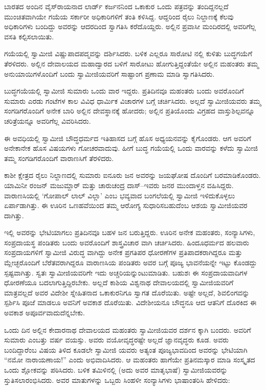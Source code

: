 ಬಾರತದ ಅಂದಿನ ವೈಸ್​ರಾಯನಾದ ಲಾರ್ಡ್ ಕರ್ಜನನಿಂದ ಒಕಾಕುರ ಒಂದು ಪತ್ರವನ್ನು ತಂದಿದ್ದನಲ್ಲದೆ ಮುಂಚಿತವಾಗಿಯೇ ಗಯೆಯ ಸರ್ಕಾರೀ ಅಧಿಕಾರಿಗಳಿಗೆ ತಂತಿ ಕಳಿಸಿದ್ದ. ಆದ್ದರಿಂದ ರೈಲು ನಿಲ್ದಾಣಕ್ಕೆ ಕೆಲವು ಅಧಿಕಾರಿಗಳು ಬಂದಿದ್ದು ಅವರನ್ನು ಆದರದಿಂದ ಸ್ವಾಗತಿಸಿ ಕರೆದೊಯ್ದರು. ಅಲ್ಲಿನ ಪ್ರವಾಸೀ ಮಂದಿರದಲ್ಲಿ ಅವರಿಗೆಲ್ಲ ವಸತಿ ಕಲ್ಪಿಸಲಾಯಿತು.

ಗಯೆಯಲ್ಲಿ ಸ್ವಾಮೀಜಿ ವಿಷ್ಣುಪಾದಪದ್ಮವನ್ನು ದರ್ಶಿಸಿದರು. ಬಳಿಕ ಎಲ್ಲರೂ ಸಾರೋಟಿ ನಲ್ಲಿ ಕುಳಿತು ಬುದ್ಧಗಯೆಗೆ ತೆರಳಿದರು. ಅಲ್ಲಿನ ದೇವಾಲಯದ ಮಹಾದ್ವಾರದ ಬಳಿಗೆ ಸಾರೋಟು ಹೋಗುತ್ತಿದ್ದಂತೆಯೇ ಅಲ್ಲಿನ ಮಹಂತರು ತಮ್ಮ ಅನುಯಾಯಿಗಳೊಂದಿಗೆ ಬಂದು ಸ್ವಾಮೀಜಿಯವರಿಗೆ ಸಾಷ್ಟಾಂಗ ಪ್ರಣಾಮ ಮಾಡಿ ಸ್ವಾಗತಿಸಿದರು.

ಬುದ್ಧಗಯೆಯಲ್ಲಿ ಸ್ವಾಮೀಜಿ ಸುಮಾರು ಒಂದು ವಾರ ಇದ್ದರು. ಪ್ರತಿದಿನವೂ ಮಹಂತರು ಬಂದು ಅವರೊಂದಿಗೆ ಸುಮಾರು ಎರಡು ಗಂಟೆಗಳ ಕಾಲ ವಿವಿಧ ಧಾರ್ಮಿಕ ವಿಚಾರಗಳ ಬಗ್ಗೆ ಚರ್ಚಿಸಿದರು. ಅಲ್ಲದೆ ಸ್ವಾಮೀಜಿಯವರು ತಮ್ಮ ಸಂಗಡಿಗರೊಂದಿಗೆ ಅನೇಕ ಬಾರಿ ಅಲ್ಲಿನ ದೇವಸ್ಥಾನಕ್ಕೆ ಹೋದರು; ಅಲ್ಲಿನ ಪ್ರತಿಯೊಂದು ವಿಗ್ರಹದ ವಾಸ್ತುಶಿಲ್ಪವನ್ನೂ ಚರಿತ್ರೆಯನ್ನೂ ಅವರಿಗೆಲ್ಲ ವಿವರಿಸಿದರು.

ಈ ಅವಧಿಯಲ್ಲಿ ಸ್ವಾಮೀಜಿ ಬೌದ್ಧಧರ್ಮದ ಇತಿಹಾಸದ ಬಗ್ಗೆ ಹೊಸ ಅಧ್ಯಯನವನ್ನು ಕೈಗೊಂಡರು. ಆಗ ಅವರಿಗೆ ಅನೇಕಾನೇಕ ಹೊಸ ವಿಷಯಗಳು ಗೋಚರವಾದುವು. ಹೀಗೆ ಬುದ್ಧ ಗಯೆಯಲ್ಲಿ ಒಂದು ವಾರವನ್ನು ಕಳೆದು ಸ್ವಾಮೀಜಿ ತಮ್ಮ ಸಂಗಡಿಗರೊಂದಿಗೆ ವಾರಾಣಸಿಗೆ ತೆರಳಿದರು.

ಕಾಶೀ ಕ್ಷೇತ್ರದ ರೈಲು ನಿಲ್ದಾಣದಲ್ಲಿ ಸುಮಾರು ಐನೂರು ಜನ ಅವರನ್ನು ಜಯಘೋಷ ದೊಂದಿಗೆ ಬರಮಾಡಿಕೊಂಡರು. ಯಾಮಿನೀ ರಂಜನ್ ಮಜುಮ್ದಾರ್ ಮತ್ತು ಚಾರುಚಂದ್ರ ದಾಸ್​–ಇವರು ಜನರ ಮುಂದಾಳ್ತನ ವಹಿಸಿದ್ದರು. ವಾರಾಣಸಿಯಲ್ಲಿ ‘ಗೋಪಾಲ್ ಲಾಲ್ ವಿಲ್ಲಾ’ ಎಂಬ ಭವ್ಯವಾದ ಬಂಗಲೆಯಲ್ಲಿ ಸ್ವಾಮೀಜಿ ಇಳಿದುಕೊಳ್ಳಲು ಏರ್ಪಾಡಾಗಿತ್ತು. ಈ ಊರಿನ ಒಣಹವೆಯಿಂದ ತಮ್ಮ ಆರೋಗ್ಯ ಸುಧಾರಿಸಬಹುದೆಂಬ ಆಶಯ ಸ್ವಾಮೀಜಿಯವರ ದಾಗಿತ್ತು.

ಇಲ್ಲಿ ಅವರನ್ನು ಭೇಟಿಯಾಗಲು ಪ್ರತಿದಿನವೂ ಬಹಳ ಜನ ಬರುತ್ತಿದ್ದರು. ಊರಿನ ಅನೇಕ ಮಹಂತರು, ಸಂನ್ಯಾಸಿಗಳು, ಸಂಪ್ರದಾಯಸ್ಥ ಪಂಡಿತರು ಬಂದು ಅವರೊಂದಿಗೆ ಶಾಸ್ತ್ರವಿಚಾರ ವಾಗಿ ಚರ್ಚಿಸಿದರು. ಹಿಂದೂಧರ್ಮದ ಹಲವಾರು ಸಂಪ್ರದಾಯಗಳಿಗೆ ಸ್ವಾಮೀಜಿ ವಿರುದ್ಧ ವಾಗಿದ್ದು ಅನೇಕ ಪ್ರಗತಿಪರ ಧೋರಣೆಗಳ ಪ್ರತಿಪಾದಕರಾಗಿದ್ದರೂ ಮತ್ತು ಮ್ಲೇಚ್ಛರೊಂದಿಗೆ ಬೆರೆತವರಾಗಿದ್ದರೂ ವಾರಾಣಸಿಯ ಪಂಡಿತರು ಅವರ ಬಗ್ಗೆ ಪೂಜ್ಯ ಭಾವನೆಯನ್ನೇ ಇಟ್ಟು ಕೊಂಡದ್ದು ಸ್ಪಷ್ಟವಾಗಿತ್ತು. ಸ್ವತಃ ಸ್ವಾಮೀಜಿಯವರಿಗೇ ಇದು ಅಚ್ಚರಿಯನ್ನುಂಟುಮಾಡಿತು. ಬಹುಶಃ ಈ ಸಂಪ್ರದಾಯವಾದಿಗಳ ಧೋರಣೆಯೂ ಬದಲಾಗುತ್ತಿದ್ದಿರಬೇಕು. ಅಲ್ಲದೆ ಕಾಶಿಯ ವಿಶ್ವನಾಥ ದೇವಾಲಯದಲ್ಲಿ ಸ್ವಾಮೀಜಿಯವರಿಗೆ ಮಾತ್ರವಲ್ಲದೆ ಅವರ ವಿದೇಶೀ ಸ್ನೇಹಿತನಾದ ಒಕಾಕುರನಿಗೂ ಸ್ವಾಗತ ದೊರೆಯಿತು. ಅಷ್ಟೇ ಅಲ್ಲದೆ, ಶಿವಲಿಂಗವನ್ನು ಸ್ಪರ್ಶಿಸಿ ಪೂಜೆ ಮಾಡಲೂ ಅವನಿಗೆ ಅವಕಾಶ ದೊರೆಯಿತು. ವಿದೇಶೀಯನೂ ಬೌದ್ಧನೂ ಆದ ಆತನಿಗೆ ದೊರಕಿದ ಈ ಅವಕಾಶ ಅಪೂರ್ವವಾದುದೆನ್ನಬೇಕು.

ಒಂದು ದಿನ ಅಲ್ಲಿನ ಕೇದಾರನಾಥ ದೇವಾಲಯದ ಮಹಂತರು ಸ್ವಾಮೀಜಿಯವರ ದರ್ಶನ ಕ್ಕಾಗಿ ಬಂದರು. ಅವರಿಗೆ ಸುಮಾರು ಎಂಬತ್ತು ವರ್ಷ ವಯಸ್ಸು. ಅವರು ವಯೋವೃದ್ಧರಷ್ಟೇ ಅಲ್ಲದೆ ಜ್ಞಾನವೃದ್ಧರು ಕೂಡ. ಅವರು ಬಂದಿದ್ದಾರೆಂಬ ವಿಷಯ ತಿಳಿದ ಕೂಡಲೇ ಸ್ವಾಮೀಜಿ ಯವರು ಅತ್ಯಂತ ಪೂಜ್ಯಭಾವದಿಂದ ಅವರನ್ನು ಭೇಟಿಯಾಗಿ “ನಮೋ ನಾರಾಯಣಾಯ!” ಎಂದು ಅಭಿವಾದಿಸಿದರು. ಆ ಮಹಂತರು ಹಾಗೆಯೇ ಪ್ರತಿನಮಸ್ಕಾರ ಮಾಡಿ ಸಂಸ್ಕೃತದ ಒಂದು ಶ್ಲೋಕವನ್ನು ಪಠಿಸಿದರು. ಬಳಿಕ ತಮಿಳಿನಲ್ಲಿ (ಅದು ಅವರ ಮಾತೃಭಾಷೆ) ಸ್ವಾಮೀಜಿಯವರನ್ನು ಸ್ತುತಿಸಲಾರಂಭಿಸಿದರು. ಅವರ ಮಾತುಗಳನ್ನು ಒಬ್ಬರು ಸಿಂಹಳೀ ಸಂನ್ಯಾಸಿಗಳು ಭಾಷಾಂತರಿಸಿ ಹೇಳಿದರು:

